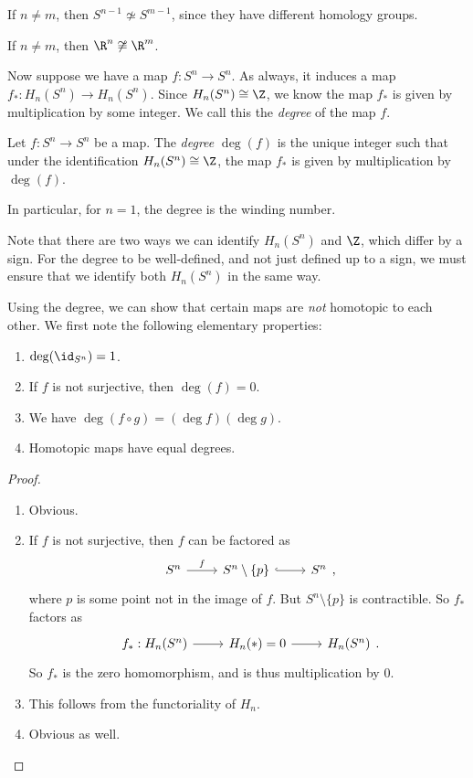 \documentclass[a4paper]{article}
\begin{document}
\begin{cor}
  If $n \not= m$, then $S^{n - 1} \not\simeq S^{m - 1}$, since they have different homology groups.
\end{cor}

\begin{cor}
  If $n \not= m$, then $\R^n \not \cong \R^m$.
\end{cor}

Now suppose we have a map $f: S^n \to S^n$. As always, it induces a map $f_*: H_n(S^n) \to H_n(S^n)$. Since $H_n (S^n) \cong \Z$, we know the map $f_*$ is given by multiplication by some integer. We call this the \emph{degree} of the map $f$.
\begin{defi}
  Let $f: S^n \to S^n$ be a map. The \emph{degree} $\deg(f)$ is the unique integer such that under the identification $H_n(S^n) \cong \Z$, the map $f_*$ is given by multiplication by $\deg(f)$.
\end{defi}
In particular, for $n = 1$, the degree is the winding number.

Note that there are two ways we can identify $H_n(S^n)$ and $\Z$, which differ by a sign. For the degree to be well-defined, and not just defined up to a sign, we must ensure that we identify both $H_n(S^n)$ in the same way.

Using the degree, we can show that certain maps are \emph{not} homotopic to each other. We first note the following elementary properties:
\begin{prop}\leavevmode
  \begin{enumerate}
    \item $\deg(\id_{S^n}) = 1$.
    \item If $f$ is not surjective, then $\deg(f) = 0$.
    \item We have $\deg(f\circ g) = (\deg f)(\deg g)$.
    \item Homotopic maps have equal degrees.
  \end{enumerate}
\end{prop}

\begin{proof}\leavevmode
  \begin{enumerate}
    \item Obvious.
    \item If $f$ is not surjective, then $f$ can be factored as
      \[
        \begin{tikzcd}
          S^n \ar[r, "f"] & S^n \setminus \{p\} \ar[r, hook] & S^n
        \end{tikzcd},
      \]
      where $p$ is some point not in the image of $f$. But $S^n \setminus \{p\}$ is contractible. So $f_*$ factors as
      \[
        \begin{tikzcd}
          f_*: H_n(S^n) \ar[r] & H_n(*) = 0 \ar[r] & H_n(S^n)
        \end{tikzcd}.
      \]
      So $f_*$ is the zero homomorphism, and is thus multiplication by $0$.
    \item This follows from the functoriality of $H_n$.
    \item Obvious as well.
  \end{enumerate}
\end{proof}
\end{document}
